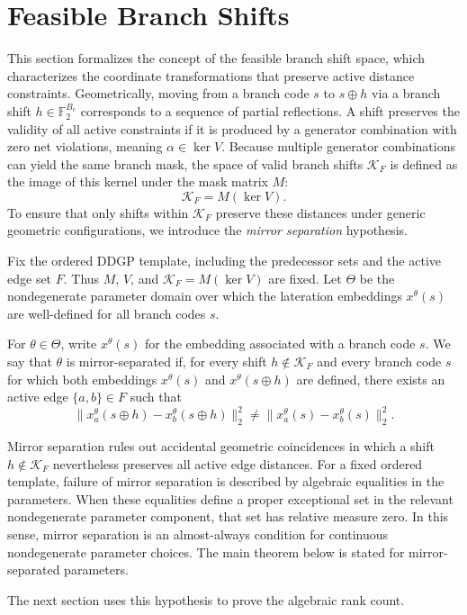 \section{Feasible Branch Shifts}
\label{sec:shifts}

This section formalizes the concept of the feasible branch shift space, which characterizes the coordinate transformations that preserve active distance constraints. 
Geometrically, moving from a branch code $s$ to $s \oplus h$ via a branch shift $h \in \mathbb{F}_2^{B_{\mathrm{c}}}$ corresponds to a sequence of partial reflections. 
A shift preserves the validity of all active constraints if it is produced by a generator combination with zero net violations, meaning $\alpha \in \ker V$. 
Because multiple generator combinations can yield the same branch mask, the space of valid branch shifts $\mathcal{K}_F$ is defined as the image of this kernel under the mask matrix $M$:
\[
\mathcal{K}_F = M(\ker V).
\]
To ensure that only shifts within $\mathcal{K}_F$ preserve these distances under generic geometric configurations, we introduce the \emph{mirror separation} hypothesis.

\begin{definition}
\label{def:mirror-sep}
Fix the ordered DDGP template, including the predecessor sets and the active edge set $F$. Thus $M$, $V$, and $\mathcal{K}_F=M(\ker V)$ are fixed. Let $\Theta$ be the nondegenerate parameter domain over which the lateration embeddings $x^\theta(s)$ are well-defined for all branch codes $s$.

For $\theta\in\Theta$, write $x^\theta(s)$ for the embedding associated with a branch code $s$. We say that $\theta$ is mirror-separated if, for every shift $h \notin \mathcal{K}_F$ and every branch code $s$ for which both embeddings $x^\theta(s)$ and $x^\theta(s\oplus h)$ are defined, there exists an active edge $\{a,b\} \in F$ such that
\[
\|x^\theta_a(s \oplus h) - x^\theta_b(s \oplus h)\|_2^2 \neq \|x^\theta_a(s) - x^\theta_b(s)\|_2^2.
\]
\end{definition}

\begin{remark}[Genericity]
Mirror separation rules out accidental geometric coincidences in which a shift $h\notin\mathcal{K}_F$ nevertheless preserves all active edge distances. For a fixed ordered template, failure of mirror separation is described by algebraic equalities in the parameters. When these equalities define a proper exceptional set in the relevant nondegenerate parameter component, that set has relative measure zero. In this sense, mirror separation is an almost-always condition for continuous nondegenerate parameter choices. The main theorem below is stated for mirror-separated parameters.
\end{remark}

The next section uses this hypothesis to prove the algebraic rank count.
